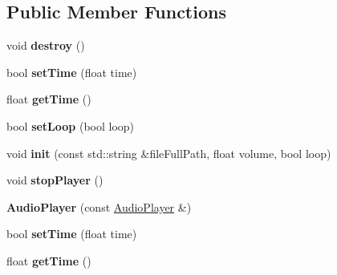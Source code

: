 \subsection*{Public Member Functions}
\begin{DoxyCompactItemize}
\item 
\mbox{\label{classexperimental_1_1AudioPlayer_a8d200d91bb062474998c34efd8d7ed77}} 
void {\bfseries destroy} ()
\item 
\mbox{\label{classexperimental_1_1AudioPlayer_a3f1d251ee3b6c099eec507a11556b52c}} 
bool {\bfseries set\+Time} (float time)
\item 
\mbox{\label{classexperimental_1_1AudioPlayer_a6250cdadefad3f948d56ea2242409ea0}} 
float {\bfseries get\+Time} ()
\item 
\mbox{\label{classexperimental_1_1AudioPlayer_a189f3f0127e8f40df984dee1de7c41a4}} 
bool {\bfseries set\+Loop} (bool loop)
\item 
\mbox{\label{classexperimental_1_1AudioPlayer_ab44dbaf1aa5c4115a41e788fafe07119}} 
void {\bfseries init} (const std\+::string \&file\+Full\+Path, float volume, bool loop)
\item 
\mbox{\label{classexperimental_1_1AudioPlayer_ac372d6a73a42fd90552a373290ed3f62}} 
void {\bfseries stop\+Player} ()
\item 
\mbox{\label{classexperimental_1_1AudioPlayer_af86e285aef599c0efb37323375b1409e}} 
{\bfseries Audio\+Player} (const \hyperlink{classexperimental_1_1AudioPlayer}{Audio\+Player} \&)
\item 
\mbox{\label{classexperimental_1_1AudioPlayer_a3f1d251ee3b6c099eec507a11556b52c}} 
bool {\bfseries set\+Time} (float time)
\item 
\mbox{\label{classexperimental_1_1AudioPlayer_a6250cdadefad3f948d56ea2242409ea0}} 
float {\bfseries get\+Time} ()
\item 

\end{DoxyCompactItemize}
